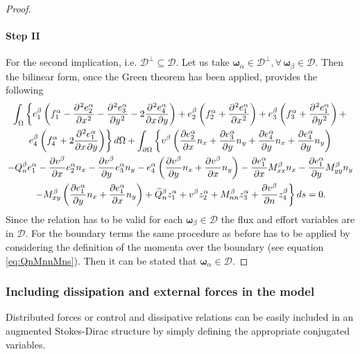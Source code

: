\documentclass[preprint,12pt]{elsarticle}
\begin{document}
\begin{proof}
		\paragraph{\textbf{Step II}}
		For the second implication, i.e. $\mathcal{D}^{\perp} \subseteq \mathcal{D}$. Let us take $\bm\omega_\alpha \in \mathcal{D}^{\perp}, \forall \, \bm\omega_\beta \in \mathcal{D}$. Then the bilinear form, once the Green theorem has been applied, provides the following
		\begin{multline}
		\int_{\Omega} \left\{ e_1^\beta \left( f_1^\alpha - \diffp[2]{e_2^\alpha}{x} - \diffp[2]{e_3^\alpha}{y} - 2 \diffp{e_4^\alpha}{x,y}  \right) + e_2^\beta \left( f_2^\alpha + \diffp[2]{e_1^\alpha}{x}  \right) + e_3^\beta \left( f_3^\alpha + \diffp[2]{e_1^\alpha}{y}  \right) + \right. \\
		\left. e_4^\beta \left( f_4^\alpha + 2 \diffp{e_1^\alpha}{x,y}  \right)  \right\} d\Omega + \int_{\partial \Omega} \left\{ v^\beta \left( \diffp{e_2^\alpha}{x} n_x + \diffp{e_3^\alpha}{y} n_y + \diffp{e_4^\alpha}{y} n_x + \diffp{e_4^\alpha}{y} n_y  \right)  \right. \\
		\left.  - Q_n^\beta e_1^\alpha - \diffp{v^\beta}{x} e_2^\alpha n_x - \diffp{v^\beta}{y} e_3^\alpha n_y   - e_4^\alpha \left( \diffp{v^\beta}{y} n_x + \diffp{v^\beta}{x} n_y  \right) - \diffp{e_1^\alpha}{x} M_{xx}^\beta n_x  - \diffp{e_1^\alpha}{y} M_{yy}^\beta n_y \right.  \\ 
		\left. - M_{xy}^\beta \left(\diffp{e_1^\alpha}{y} n_x + \diffp{e_1^\alpha}{x} n_y  \right) + \widetilde{Q}_n^\beta z_1^\alpha + v^\beta z_2^\alpha + M_{nn}^\beta z_3^\alpha + \diffp{v^\beta}{n} z_4^\beta \right\} ds = 0. 
		\end{multline}
		Since the relation has to be valid for each $\bm\omega_\beta \in \mathcal{D}$ the flux and effort variables are in $\mathcal{D}$. For the boundary terms the same procedure as before has to be applied by considering the definition of the momenta over the boundary (see equation \eqref{eq:QnMnnMns}). Then it can be stated that $\bm\omega_\alpha \in \mathcal{D}$.
	\end{proof}
	
	\subsubsection{Including dissipation and external forces in the model}
		Distributed forces or control and dissipative relations can be easily included in an augmented Stokes-Dirac structure by simply defining the appropriate conjugated variables. \\
		
\end{document}
